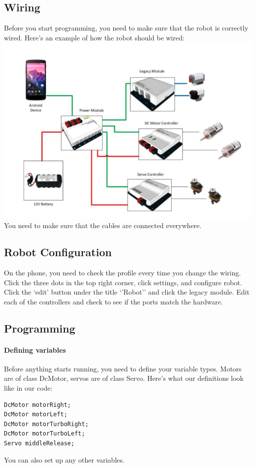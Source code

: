 \documentclass[12p,a4papert]{article}
\begin{document}
\subsection{Wiring}
Before you start programming, you need to make sure that the robot is correctly wired. Here's an example of how the robot should be wired:\\
\includegraphics[scale=0.3]{robot-wiring}\\
You need to make sure that the cables are connected everywhere.
\subsection{Robot Configuration}
On the phone, you need to check the profile every time you change the wiring. Click the three dots in the top right corner, click settings, and configure robot. Click the `edit' button under the title `'Robot'' and click the legacy module. Edit each of the controllers and check to see if the ports match the hardware.
\subsection{Programming}
\paragraph{Defining variables}Before anything starts running, you need to define your variable types. Motors are of class DcMotor, servos are of class Servo. Here's what our definitions look like in our code:
\begin{verbatim}
DcMotor motorRight;
DcMotor motorLeft;
DcMotor motorTurboRight;
DcMotor motorTurboLeft;
Servo middleRelease;
\end{verbatim}
You can also set up any other variables.
\end{document}
